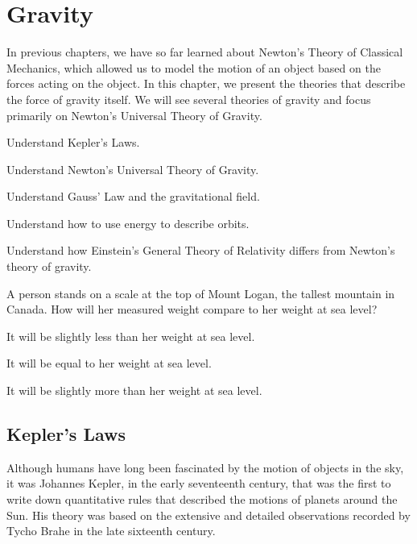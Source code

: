 
\chapter{Gravity}
\label{chapter:gravity}
In previous chapters, we have so far learned about Newton's Theory of Classical Mechanics, which allowed us to model the motion of an object based on the forces acting on the object. In this chapter, we present the theories that describe the force of gravity itself. We will see several theories of gravity and focus primarily on Newton's Universal Theory of Gravity. 

\begin{learningObjectives}{
 \item Understand Kepler's Laws.
 \item Understand Newton's Universal Theory of Gravity. 
 \item Understand Gauss' Law and the gravitational field.
 \item Understand how to use energy to describe orbits.
 \item Understand how Einstein's General Theory of Relativity differs from Newton's theory of gravity.
 }
\end{learningObjectives}

\begin{opening}
\begin{MCquestion}{A person stands on a scale at the top of Mount Logan, the tallest mountain in Canada. How will her measured weight compare to her weight at sea level?}
\item It will be slightly less than her weight at sea level. \correct
\item It will be equal to her weight at sea level.
\item It will be slightly more than her weight at sea level.
\end{MCquestion}
\end{opening}


\section{Kepler's Laws}
Although humans have long been fascinated by the motion of objects in the sky, it was Johannes Kepler, in the early seventeenth century, that was the first to write down quantitative rules that described the motions of planets around the Sun. His theory was based on the extensive and detailed observations recorded by Tycho Brahe in the late sixteenth century. 

